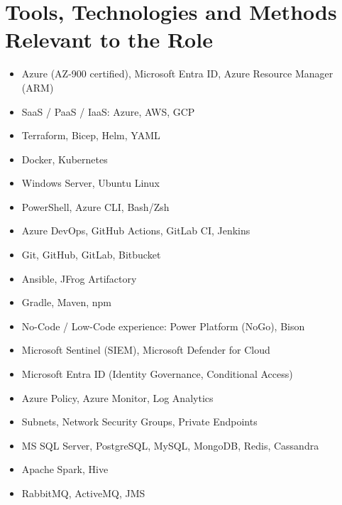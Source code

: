 \section{Tools, Technologies and Methods Relevant to the Role}
\begin{cvcolumns}
        {\begin{itemize}
            \item Azure (AZ-900 certified), Microsoft Entra ID, Azure Resource Manager (ARM)
            \item SaaS / PaaS / IaaS: Azure, AWS, GCP
            \item Terraform, Bicep, Helm, YAML
            \item Docker, Kubernetes
            \item Windows Server, Ubuntu Linux
            \item PowerShell, Azure CLI, Bash/Zsh
        \end{itemize}}
        {\begin{itemize}
            \item Azure DevOps, GitHub Actions, GitLab CI, Jenkins
            \item Git, GitHub, GitLab, Bitbucket
            \item Ansible, JFrog Artifactory
            \item Gradle, Maven, npm
            \item No-Code / Low-Code experience: Power Platform (NoGo), Bison
        \end{itemize}}
\end{cvcolumns}

\begin{cvcolumns}
        {\begin{itemize}
            \item Microsoft Sentinel (SIEM), Microsoft Defender for Cloud
            \item Microsoft Entra ID (Identity Governance, Conditional Access)
            \item Azure Policy, Azure Monitor, Log Analytics
            \item Subnets, Network Security Groups, Private Endpoints
        \end{itemize}}
        {\begin{itemize}
            \item MS SQL Server, PostgreSQL, MySQL, MongoDB, Redis, Cassandra
            \item Apache Spark, Hive
            \item RabbitMQ, ActiveMQ, JMS
        \end{itemize}}
\end{cvcolumns}

